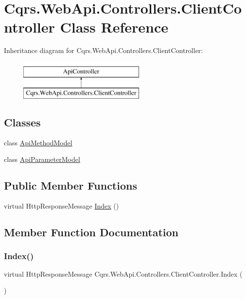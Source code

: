 \hypertarget{classCqrs_1_1WebApi_1_1Controllers_1_1ClientController}{}\section{Cqrs.\+Web\+Api.\+Controllers.\+Client\+Controller Class Reference}
\label{classCqrs_1_1WebApi_1_1Controllers_1_1ClientController}
Inheritance diagram for Cqrs.\+Web\+Api.\+Controllers.\+Client\+Controller\+:\begin{figure}[H]
\begin{center}
\leavevmode
\includegraphics[height=2.000000cm]{classCqrs_1_1WebApi_1_1Controllers_1_1ClientController}
\end{center}
\end{figure}
\subsection*{Classes}
\begin{DoxyCompactItemize}
\item 
class \hyperlink{classCqrs_1_1WebApi_1_1Controllers_1_1ClientController_1_1ApiMethodModel}{Api\+Method\+Model}
\item 
class \hyperlink{classCqrs_1_1WebApi_1_1Controllers_1_1ClientController_1_1ApiParameterModel}{Api\+Parameter\+Model}
\end{DoxyCompactItemize}
\subsection*{Public Member Functions}
\begin{DoxyCompactItemize}
\item 
virtual Http\+Response\+Message \hyperlink{classCqrs_1_1WebApi_1_1Controllers_1_1ClientController_abcd1d9049d9e3cee06558ccf055639f3}{Index} ()
\end{DoxyCompactItemize}


\subsection{Member Function Documentation}
\mbox{\label{classCqrs_1_1WebApi_1_1Controllers_1_1ClientController_abcd1d9049d9e3cee06558ccf055639f3}} 
\subsubsection{\texorpdfstring{Index()}{Index()}}
{\footnotesize\ttfamily virtual Http\+Response\+Message Cqrs.\+Web\+Api.\+Controllers.\+Client\+Controller.\+Index (\begin{DoxyParamCaption}{ }\end{DoxyParamCaption})\hspace{0.3cm}{\ttfamily [virtual]}}

